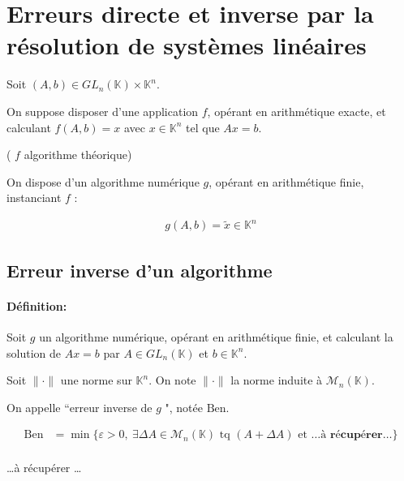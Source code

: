 \documentclass{article}
\newcommand{\cM}{\mathcal{M}}
\newcommand{\K}{\mathbb{K}}
\renewcommand{\epsilon}{\varepsilon}
\newenvironment{definition}[1][\unskip]{
	\paragraph{Définition: #1}

}{}
\begin{document}
\section{Erreurs directe et inverse par la résolution de systèmes linéaires}

Soit $(A, b) \in GL_n(\K)  \times \K^{n}$.
 
On suppose disposer d'une application $f$, opérant en arithmétique exacte, et calculant $f(A, b) = x$ avec $x\in \K^{n}$ tel que $Ax = b$.

( $f$ algorithme théorique)

On dispose d'un algorithme numérique $g$, opérant en arithmétique finie, instanciant $f$ :

\begin{align*}
    g(A, b) = \tilde{x} \in \K^{n}
\end{align*}

\subsection{Erreur inverse d'un algorithme}

\begin{definition}
    Soit $g$ un algorithme numérique, opérant en arithmétique finie, et calculant la solution de $Ax=b$ par $A\in GL_n(\K)$ et $b\in \K^{n}$.

    Soit $\| \cdot \|$ une norme sur $\K^{n}$. On note $\| \cdot \|$ la norme induite à $\cM_n(\K)$.

    On appelle ``erreur inverse de $g$ ", notée $\text{Ben}$.

    \begin{align*}
        \text{Ben}&= \min \{\epsilon > 0,\ \exists \Delta A \in \cM_n(\K) \text{ tq } (A + \Delta A) \text{ et } \ldots \textbf{à récupérer} \ldots  \}  \\
    \end{align*}
\end{definition}


\ldots à récupérer \ldots
\end{document}
